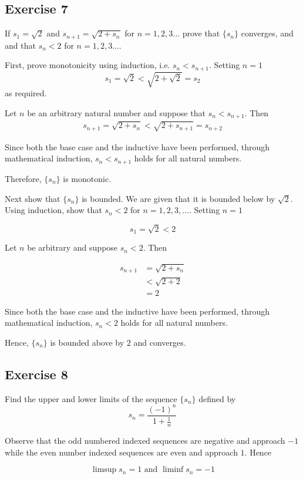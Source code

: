 \documentclass{tufte-book}
\theoremstyle{mytheoremstyle}
\theoremstyle{mylemstyle}
\theoremstyle{mydefstyle}
\begin{document}
\subsection{Exercise 7}
If $s_1 = \sqrt{2}$ and $s_{n+1} = \sqrt{2 + s_n}$ for $n=1,2,3...$ prove that $\{s_n\}$ converges, and and that $s_n < 2$ for $n=1,2,3...$.

First, prove monotonicity using induction, i.e. $s_n < s_{n+1}$.
Setting $n=1$
\[ s_1 = \sqrt{2} < \sqrt{2 + \sqrt{2}} = s_2 \]
as required.

Let $n$ be an arbitrary natural number and suppose that $s_n < s_{n+1}$.  Then
\begin{align*}
s_{n+1} = \sqrt{2 + s_n} < \sqrt{2 + s_{n+1}} = s_{n+2}
\end{align*}

Since both the base case and the inductive have been performed, through mathematical induction, $s_n < s_{n+1}$ holds for all natural numbers.

Therefore, $\{s_n\}$ is monotonic.

Next show that $\{s_n\}$ is bounded.  We are given that it is bounded below by $\sqrt{2}$. Using induction, show that $s_n < 2$ for $n=1,2,3,...$.  Setting $n=1$

\[ s_1 = \sqrt{2} < 2 \]

Let $n$ be arbitrary and suppose $s_n < 2$.  Then

\begin{align*}
s_{n+1} &= \sqrt{2 + s_n}\\
&< \sqrt{2 + 2}\\
&=2
\end{align*}

Since both the base case and the inductive have been performed, through mathematical induction, $s_n < 2$ holds for all natural numbers.

Hence, $\{s_n\}$ is bounded above by $2$ and converges.

\subsection{Exercise 8}
Find the upper and lower limits of the sequence $\{s_n\}$ defined by
\[ s_n = \frac{(-1)^n}{1+\frac{1}{n}} \]

Observe that the odd numbered indexed sequences are negative and approach $-1$ while the even number indexed sequences are even and approach $1$. Hence

\[ \limsup s_n = 1 \text{ and } \liminf s_n = -1 \]
\end{document}
